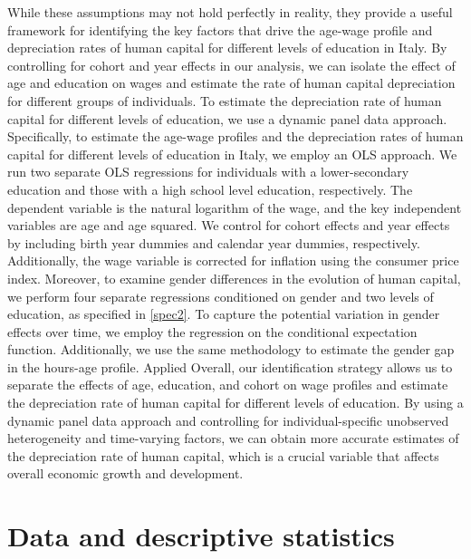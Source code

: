 \documentclass[14pt]{sistedes}
\begin{document}
While these assumptions may not hold perfectly in reality, they provide a useful framework for identifying the key factors that drive the age-wage profile and depreciation rates of human capital for different levels of education in Italy. By controlling for cohort and year effects in our analysis, we can isolate the effect of age and education on wages and estimate the rate of human capital depreciation for different groups of individuals.
\newline
To estimate the depreciation rate of human capital for different levels of education, we use a dynamic panel data approach. Specifically, to estimate the age-wage profiles and the depreciation rates of human capital for different levels of education in Italy, we employ an OLS approach. We run two separate OLS regressions for individuals with a lower-secondary education and those with a high school level education, respectively. The dependent variable is the natural logarithm of the wage, and the key independent variables are age and age squared. We control for cohort effects and year effects by including birth year dummies and calendar year dummies, respectively. Additionally, the wage variable is corrected for inflation using the consumer price index.
\newline
Moreover, to examine gender differences in the evolution of human capital, we perform four separate regressions conditioned on gender and two levels of education, as specified in \ref{spec2}. To capture the potential variation in gender effects over time, we employ the regression on the conditional expectation function. Additionally, we use the same methodology to estimate the gender gap in the hours-age profile.
\newline
 Applied Overall, our identification strategy allows us to separate the effects of age, education, and cohort on wage profiles and estimate the depreciation rate of human capital for different levels of education. By using a dynamic panel data approach and controlling for individual-specific unobserved heterogeneity and time-varying factors, we can obtain more accurate estimates of the depreciation rate of human capital, which is a crucial variable that affects overall economic growth and development.
\section{Data and descriptive statistics}
\end{document}
